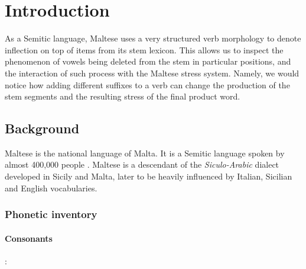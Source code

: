 \documentclass[11pt,draft]{article}
\begin{document}
\maketitle


\section{Introduction}

As a Semitic language, Maltese uses a very structured verb morphology to denote inflection on top of items from its stem lexicon.
This allows us to inspect the phenomenon of vowels being deleted from the stem in particular positions, and the interaction of such process with the Maltese stress system.
Namely, we would notice how adding different suffixes to a verb can change the production of the stem segments and the resulting stress of the final product word.

\subsection{Background}
Maltese is the national language of Malta. It is a Semitic language spoken by almost 400,000 people \cite{borg1997}.
Maltese is a descendant of the \emph{Siculo-Arabic} dialect developed in Sicily and Malta, later to be heavily influenced by Italian, Sicilian and English vocabularies.

\subsubsection{Phonetic inventory}

\paragraph{Consonants}
:

\end{document}
